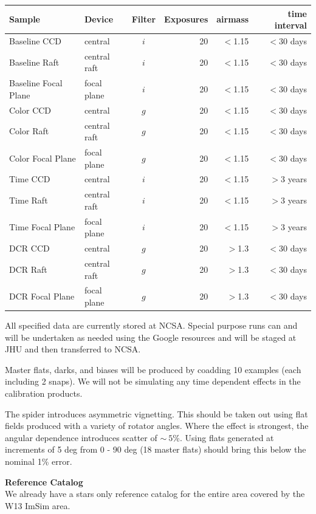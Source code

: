 \documentclass[12pt]{article}
\begin{document}
\begin{table}
\begin{tabular}{llcrrr}
Sample & Device & Filter & Exposures & airmass & time interval \\
\hline  
Baseline CCD             & central         & $i$  & 20 & $<$1.15 &$<$30 days \\
Baseline Raft              & central raft  & $i$  & 20 & $<$1.15 &$<$30 days \\
Baseline Focal Plane   & focal plane  &  $i$ & 20 & $<$1.15 &$<$30
days \\
\hline  
Color CCD             & central         & $g$  & 20 & $<$1.15 &$<$30 days \\
Color Raft              & central raft  & $g$  & 20 & $<$1.15 &$<$30 days \\
Color Focal Plane   & focal plane  &  $g$ & 20 & $<$1.15 &$<$30 days \\
\hline 
Time CCD             & central         & $i$  & 20 & $<$1.15 &$>$3 years \\
Time Raft              & central raft  & $i$  & 20 & $<$1.15 &$>$3 years \\
Time Focal Plane   & focal plane  &  $i$ & 20 & $<$1.15 &$>$3 years \\
\hline 
DCR CCD             & central         & $g$  & 20 & $>$1.3 &$<$30 days \\
DCR Raft              & central raft  & $g$  & 20 & $>$1.3 &$<$30 days \\
DCR Focal Plane   & focal plane  & $g$  & 20 & $>$1.3 &$<$30 days
\end{tabular}
\end{table}


All specified data are currently stored at NCSA.  Special purpose runs
can and will be undertaken as needed using the Google resources and
will be staged at JHU and then transferred to NCSA.  

Master flats, darks, and biases will be produced by coadding 10
examples (each including 2 snaps).  We will not be simulating any time
dependent effects in the calibration products.

The spider introduces asymmetric vignetting.  This should be taken out
using flat fields produced with a variety of rotator angles.  Where
the effect is strongest, the angular dependence introduces scatter of
$\sim~5$\%.  Using flats generated at increments of 5 deg from 0 - 90
deg (18 master flats) should bring this below the nominal 1\% error.  

{\bf Reference Catalog}\\
We already have a stars only reference catalog for the entire area
covered by the W13 ImSim area.  
\end{document}

